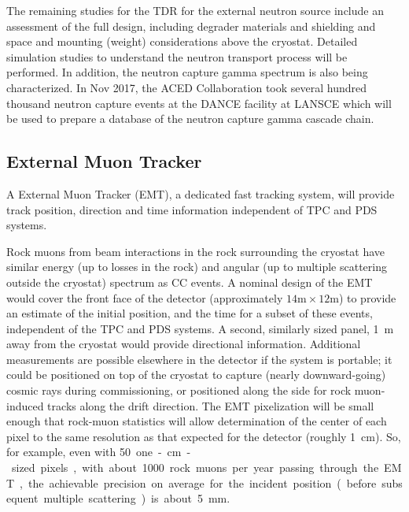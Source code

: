 The remaining studies for the TDR for the external neutron source include an assessment of the full design, including degrader materials and shielding and space and mounting (weight) considerations above the cryostat. Detailed simulation studies to understand the neutron transport process will be performed. In addition, the neutron capture gamma spectrum is also being characterized. In Nov 2017, the ACED Collaboration took several hundred thousand neutron capture events at the DANCE facility at LANSCE which will be used to prepare a database of the neutron capture gamma cascade chain. 

\subsection{External Muon Tracker} %
\label{sec:calibemt}

A External Muon Tracker (EMT), a dedicated fast tracking system, will provide track position, direction and time information independent of TPC and PDS systems.

Rock muons from beam interactions in the rock surrounding the cryostat have similar energy (up to losses in the rock) and angular (up to multiple scattering outside the cryostat) spectrum as CC \numu 
events. A nominal design of the EMT would cover the front face of the detector (approximately $14\textrm{m} \times 12\textrm{m}$) to provide an estimate of the initial position, and the time for a subset of these events, independent of the TPC and PDS systems. A second, similarly sized panel, \SI{1}{\m} away from the cryostat would provide directional information. 
Additional measurements are possible elsewhere in the detector if the system is portable; it could be positioned on top of the cryostat to capture (nearly downward-going) cosmic rays during commissioning, or positioned along the side for rock muon-induced tracks along the drift direction. The EMT  pixelization will be small enough that rock-muon statistics will allow  determination of the center of each pixel to the same resolution as that expected for the detector (roughly \SI{1}{\cm}). So, for example, even with \SI{50} one-\si{\cm}-sized pixels,  with about \num{1000} rock muons per year passing through the EMT, the achievable precision  on average  for the incident position (before subsequent multiple scattering) is about \SI{5}{\milli\m}. 

